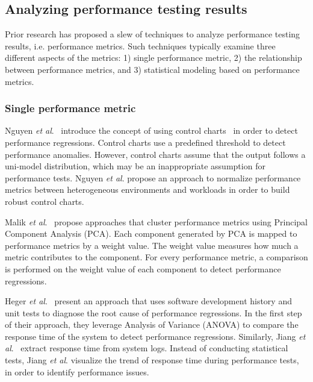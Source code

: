 \subsection{Analyzing performance testing results} 
\label{sec:related_types_of_analysis}

Prior research has proposed a slew of techniques to analyze performance testing results, i.e. performance metrics. Such techniques typically examine three different aspects of the metrics: 1) single performance metric, 2) the relationship between performance metrics, and 3) statistical modeling based on performance metrics.


\subsubsection{Single performance metric}
\label{sec:relatedindividual}
Nguyen \textit{et al$.$}~\cite{Nguyen:2012:ADP:2188286.2188344} introduce the concept of using control charts~\cite{shewhart1931economic} in order to detect performance regressions. Control charts use a predefined threshold to detect performance anomalies. However, control charts assume that the output follows a uni-model distribution, which may be an inappropriate assumption for performance tests. Nguyen \textit{ et al$.$} propose an approach to normalize performance metrics between heterogeneous environments and workloads in order to build robust control charts. %

Malik \emph{et al$.$}~\cite{Malik:2010:ACL:1955601.1955936, haroon} propose approaches that cluster performance metrics using Principal Component Analysis (PCA). Each component generated by PCA is mapped to performance metrics by a weight value. The weight value measures how much a metric contributes to the component. For every performance metric, a comparison is performed on the weight value of each component to detect performance regressions.

Heger \emph{et al$.$}~\cite{DBLP:conf/wosp/HegerHF13} present an approach that uses software development history and unit tests to diagnose the root cause of performance regressions. In the first step of their approach, they leverage Analysis of Variance (ANOVA) to compare the response time of the system to detect performance regressions. Similarly, Jiang \emph{et al$.$}~\cite{jackicsm2009} extract response time from system logs. Instead of conducting statistical tests, Jiang \emph{et al$.$} visualize the trend of response time during performance tests, in order to identify performance issues.


